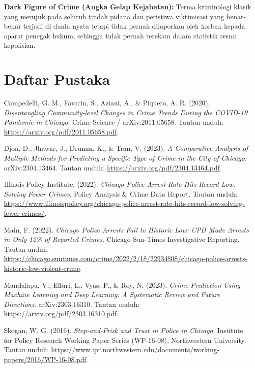 \documentclass[11pt,a4paper]{article}
\begin{document}
\textbf{Dark Figure of Crime (Angka Gelap Kejahatan):} Terma kriminologi klasik yang merujuk pada seluruh tindak pidana dan peristiwa viktimisasi yang benar-benar terjadi di dunia nyata tetapi tidak pernah dilaporkan oleh korban kepada aparat penegak hukum, sehingga tidak pernah terekam dalam statistik resmi kepolisian.


\section*{Daftar Pustaka}

\begin{enumerate}[label={[\arabic*]}, leftmargin=2em]
     Campedelli, G. M., Favarin, S., Aziani, A., \& Piquero, A. R. (2020). \textit{Disentangling Community-level Changes in Crime Trends During the COVID-19 Pandemic in Chicago}. Crime Science / arXiv:2011.05658. Tautan unduh: \url{https://arxiv.org/pdf/2011.05658.pdf}.
    
     Djon, D., Jhawar, J., Drumm, K., \& Tran, V. (2023). \textit{A Comparative Analysis of Multiple Methods for Predicting a Specific Type of Crime in the City of Chicago}. arXiv:2304.13464. Tautan unduh: \url{https://arxiv.org/pdf/2304.13464.pdf}.
    
     Illinois Policy Institute. (2022). \textit{Chicago Police Arrest Rate Hits Record Low, Solving Fewer Crimes}. Policy Analysis \& Crime Data Report. Tautan unduh: \url{https://www.illinoispolicy.org/chicago-police-arrest-rate-hits-record-low-solving-fewer-crimes/}.
    
     Main, F. (2022). \textit{Chicago Police Arrests Fall to Historic Low: CPD Made Arrests in Only 12\% of Reported Crimes}. Chicago Sun-Times Investigative Reporting. Tautan unduh: \url{https://chicago.suntimes.com/crime/2022/2/18/22934808/chicago-police-arrests-historic-low-violent-crime}.
    
     Mandalapu, V., Elluri, L., Vyas, P., \& Roy, N. (2023). \textit{Crime Prediction Using Machine Learning and Deep Learning: A Systematic Review and Future Directions}. arXiv:2303.16310. Tautan unduh: \url{https://arxiv.org/pdf/2303.16310.pdf}.
    
     Skogan, W. G. (2016). \textit{Stop-and-Frisk and Trust in Police in Chicago}. Institute for Policy Research Working Paper Series (WP-16-08), Northwestern University. Tautan unduh: \url{https://www.ipr.northwestern.edu/documents/working-papers/2016/WP-16-08.pdf}.
    

\end{enumerate}
\end{document}
